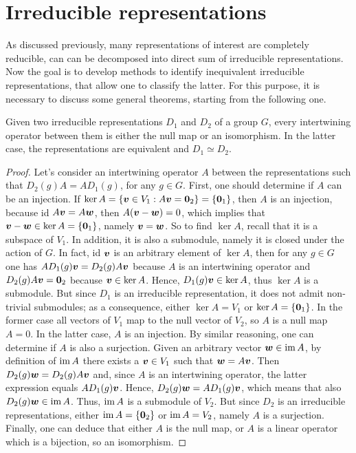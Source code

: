 \section{Irreducible representations}
As discussed previously, many representations of interest are completely reducible, can can be decomposed into direct sum of irreducible representations. Now the goal is to develop methods to identify inequivalent irreducible representations, that allow one to classify the latter. For this purpose, it is necessary to discuss some general theorems, starting from the following one. 
\begin{lem}
    Given two irreducible representations $D_1$ and $D_2$ of a group $G$, every intertwining operator between them is either the null map or an isomorphism. In the latter case, the representations are equivalent and $D_1 \simeq D_2$.
\end{lem}
\begin{proof}
    Let's consider an intertwining operator $A$ between the representations such that $D_2(g)A = AD_1(g)$, for any $g \in G$. First, one should determine if $A$ can be an injection. If $\ker{A} = \{\bm{v} \in V_1 : A\bm{v} = \bm{0}_2\} = \{\bm{0}_1\}$, then $A$ is an injection, because id $A\bm{v} = A\bm{w}$, then $A(\bm{v} - \bm{w}) = 0$, which implies that $\bm{v} - \bm{w} \in \ker{A} = \{\bm{0}_1\}$, namely $\bm{v} = \bm{w}$. So to find $\ker{A}$, recall that it is a subspace of $V_1$. In addition, it is also a submodule, namely it is closed under the action of $G$. In fact, id $\bm{v}$ is an arbitrary element of $\ker{A}$, then for any $g \in G$ one has $AD_1(g)\bm{v} = D_2(g)A\bm{v}$ because $A$ is an intertwining operator and $D_2(g)A\bm{v} = \bm{0}_2$ because $\bm{v} \in \ker{A}$. Hence, $D_1(g)\bm{v} \in \ker{A}$, thus $\ker{A}$ is a submodule. But since $D_1$ is an irreducible representation, it does not admit non-trivial submodules; as a consequence, either $\ker{A} = V_1$ or $\ker{A} = \{\bm{0}_1\}$. In the former case all vectors of $V_1$ map to the null vector of $V_2$, so $A$ is a null map $A = 0$. In the latter case, $A$ is an injection. By similar reasoning, one can determine if $A$ is also a surjection. Given an arbitrary vector $\bm{w} \in \mathrm{im}\,{A}$, by definition of $\mathrm{im}\,{A}$ there exists a $\bm{v} \in V_1$ such that $\bm{w} = A\bm{v}$. Then $D_2(g)\bm{w} = D_2(g)A\bm{v}$ and, since $A$ is an intertwining operator, the latter expression equals $AD_1(g)\bm{v}$. Hence, $D_2(g)\bm{w} = AD_1(g)\bm{v}$, which means that also $D_2(g)\bm{w} \in \mathrm{im}\,{A}$. Thus, $\mathrm{im}\,{A}$ is a submodule of $V_2$. But since $D_2$ is an irreducible representations, either $\mathrm{im}\,{A} = \{\bm{0}_2\}$ or $\mathrm{im}\,{A} = V_2$, namely $A$ is a surjection. Finally, one can deduce that either $A$ is the null map, or $A$ is a linear operator which is a bijection, so an isomorphism.
\end{proof}
